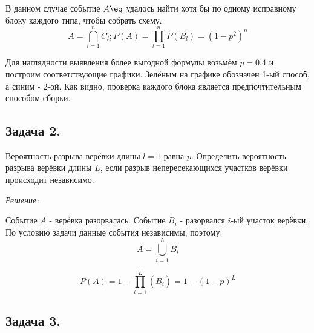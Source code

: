 В данном случае событие $A \eq$ удалось найти хотя бы по одному исправному блоку каждого типа, чтобы собрать схему.
\[ A = \bigcap\limits_{l=1}^n C_l; P(A) = \prod_{l=1}^{n} P(B_l) = (1-p^2)^n \]

Для наглядности выявления более выгодной формулы возьмём $p=0.4$ и построим соответствующие графики. Зелёным на графике обозначен 1-ый способ, а синим - 2-ой. Как видно, проверка каждого блока является предпочтительным способом сборки.
\begin{figure}[H]
\end{figure}

\subsection*{Задача 2.}

Вероятность разрыва верёвки длины $l = 1$ равна $p$. Определить вероятность разрыва верёвки длины $L$, если разрыв непересекающихся участков верёвки происходит независимо.

\textit{Решение:}

Событие $A$ - верёвка разорвалась. Событие $B_i$ - разорвался $i$-ый участок верёвки. По условию задачи данные события независимы, поэтому:
\[ A = \bigcup\limits_{i=1}^{L} B_i \]

\[ P(A) = 1 - \prod_{i=1}^{L} (\bar B_i) = 1 - (1 - p)^{L} \]

\subsection*{Задача 3.}

